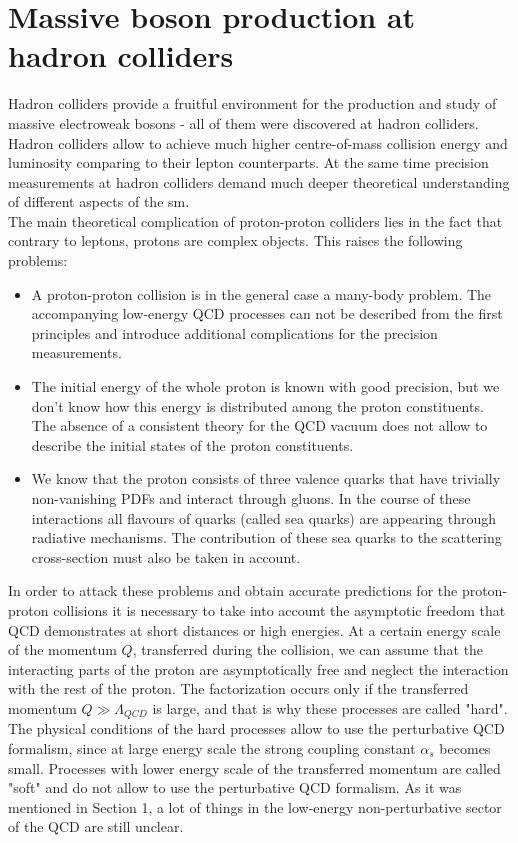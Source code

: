         \section{Massive boson production at hadron colliders}
		Hadron colliders provide a fruitful environment for the production and study of massive electroweak bosons - all of them were discovered at hadron colliders. Hadron colliders allow to achieve much higher centre-of-mass collision energy and luminosity comparing to their lepton counterparts. At the same time precision measurements at hadron colliders demand much deeper theoretical understanding of different aspects of the \gls{sm}. \\
		The main theoretical complication of proton-proton colliders lies in the fact that contrary to leptons, protons are complex objects. This raises the following problems:
		\begin{itemize}
		\item A proton-proton collision is in the general case a many-body problem. The accompanying low-energy QCD processes can not be described from the first principles and introduce additional complications for the precision measurements.
		\item The initial energy of the whole proton is known with good precision, but we don't know how this energy is distributed among the proton constituents. The absence of a consistent theory for the QCD vacuum does not allow to describe the initial states of the proton constituents.
		\item We know that the proton consists of three valence quarks that have trivially non-vanishing PDFs and interact through gluons. In the course of these interactions all flavours of quarks (called sea quarks) are appearing through radiative mechanisms. The contribution of these sea quarks to the scattering cross-section must also be taken in account.  
		\end{itemize}
		In order to attack these problems and obtain accurate predictions for the proton-proton collisions it is necessary to take into account the asymptotic freedom that QCD demonstrates at short distances or high energies. At a certain energy scale of the momentum $Q$, transferred during the collision, we can assume that the interacting parts of the proton are asymptotically free and neglect the interaction with the rest of the proton. The factorization occurs only if the transferred momentum $Q\gg \Lambda_{QCD}$ is large, and that is why these processes are called "hard". The physical conditions of the hard processes allow to use the perturbative QCD formalism, since at large energy scale the strong coupling constant $\alpha_s$ becomes small. Processes with lower energy scale of the transferred momentum are called "soft" and do not allow to use the perturbative QCD formalism. As it was mentioned in Section 1, a lot of things in the low-energy non-perturbative sector of the QCD are still unclear. \\
